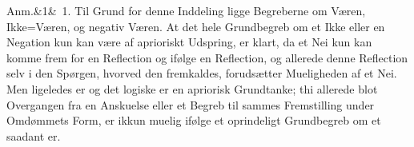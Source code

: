 \documentclass[12pt]{book}
\def\sperr#1{#1}%
\def\textit#1{#1}%
\def\emph#1{#1}%
\newcommand{\sperr}[1]{\textls[180]{#1}}
\newcommand{\anm}[1]{%
  \par\vspace{0.5\baselineskip}%
  \noindent\hspace{\parindent}\sperr{Anm.}\ifx&#1&\else~\textit{#1}.\fi
  \enspace\ignorespaces
}
\begin{document}
\anm{1} Til Grund for denne Inddeling ligge Begreberne om \emph{Væren}, Ikke=\emph{Væren},
og negativ \emph{Væren}. At det hele Grundbegreb om et Ikke eller en Negation kun kan være
af aprioriskt Udspring, er klart, da et Nei kun kan komme frem for en Reflection og ifølge
en Reflection, og allerede denne Reflection selv i den Spørgen, hvorved den fremkaldes,
forudsætter Mueligheden af et Nei. Men ligeledes er og det logiske \sperr{er} en apriorisk
Grundtanke; thi allerede blot Overgangen fra en Anskuelse eller et Begreb til sammes
Fremstilling under Omdømmets Form, er ikkun muelig ifølge et oprindeligt Grundbegreb om et
saadant er.
\end{document}

